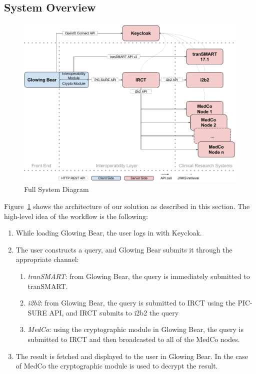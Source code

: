 \subsection{System Overview}
\begin{figure}[ht]
    \centering
    \includegraphics[width=1\textwidth]{figures/sys_diagram_full.pdf}
    \caption{Full System Diagram}
    \label{fig:sys-diagram-full}
\end{figure}

Figure~\ref{fig:sys-diagram-full} shows the architecture of our solution as described in this section.
The high-level idea of the workflow is the following:
\begin{enumerate}
    \item \label{enum:wf-init} While loading Glowing Bear, the user logs in with Keycloak.
    \item The user constructs a query, and Glowing Bear submits it through the appropriate channel:
    \begin{enumerate}
        \item \label{enum:wf-transmart} \emph{tranSMART}: from Glowing Bear, the query is immediately submitted to tranSMART.
        \item \label{enum:wf-i2b2} \emph{i2b2}: from Glowing Bear, the query is submitted to IRCT using the PIC-SURE API, and IRCT submits to i2b2 the query
        \item \label{enum:wf-medco} \emph{MedCo}: using the cryptographic module in Glowing Bear, the query is submitted to IRCT and then broadcasted to all of the MedCo nodes.
    \end{enumerate}
    \item \label{enum:wf-results} The result is fetched and displayed to the user in Glowing Bear. In the case of MedCo the cryptographic module is used to decrypt the result.
\end{enumerate}

